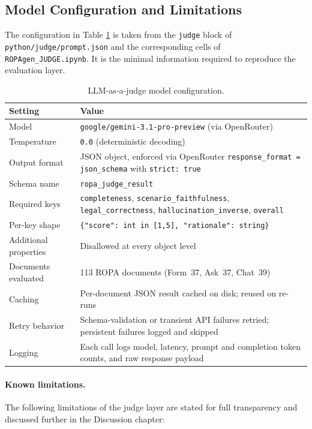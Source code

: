 \subsection{Model Configuration and Limitations}
\label{app:judge-config}

The configuration in Table \ref{tab:judge-config} is taken from the \texttt{judge} block of \texttt{python/judge/\allowbreak prompt.json} and the corresponding cells of \texttt{ROPAgen\_JUDGE.ipynb}. It is the minimal information required to reproduce the evaluation layer.

\begin{table}[H]
\centering
\small
\begin{tabularx}{\textwidth}{lX}
\toprule
\textbf{Setting} & \textbf{Value} \\
\midrule
Model & \texttt{google/gemini-3.1-pro-preview} (via OpenRouter) \\
Temperature & \texttt{0.0} (deterministic decoding) \\
Output format & JSON object, enforced via OpenRouter \texttt{response\_format = json\_schema} with \texttt{strict: true} \\
Schema name & \texttt{ropa\_judge\_result} \\
Required keys & \texttt{completeness}, \texttt{scenario\_faithfulness}, \texttt{legal\_correctness}, \texttt{hallucination\_inverse}, \texttt{overall} \\
Per-key shape & \texttt{\{"score": int in [1,5], "rationale": string\}} \\
Additional properties & Disallowed at every object level \\
Documents evaluated & 113 ROPA documents (Form~37, Ask~37, Chat~39) \\
Caching & Per-document JSON result cached on disk; reused on re-runs \\
Retry behavior & Schema-validation or transient API failures retried; persistent failures logged and skipped \\
Logging & Each call logs model, latency, prompt and completion token counts, and raw response payload \\
\bottomrule
\end{tabularx}
\caption{LLM-as-a-judge model configuration.}
\label{tab:judge-config}
\end{table}

\paragraph{Known limitations.} The following limitations of the judge layer are stated for full transparency and discussed further in the Discussion chapter:

